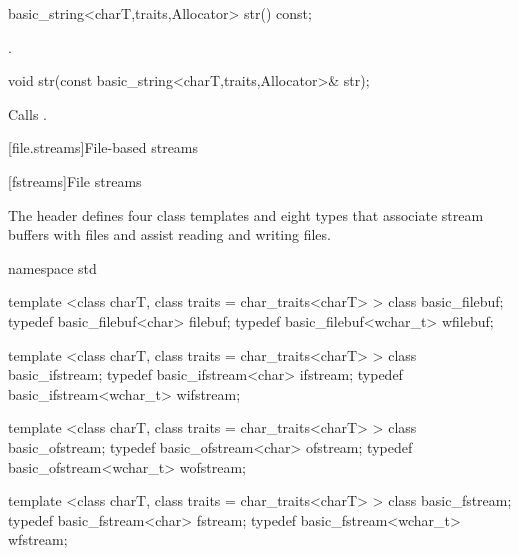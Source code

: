 %
\begin{itemdecl}
basic_string<charT,traits,Allocator> str() const;
\end{itemdecl}

\begin{itemdescr}
\pnum
\returns
{}.
\end{itemdescr}

%
%
\begin{itemdecl}
void str(const basic_string<charT,traits,Allocator>& str);
\end{itemdecl}

\begin{itemdescr}
\pnum
\effects
Calls
.
\end{itemdescr}

[file.streams]{File-based streams}

[fstreams]{File streams}

\pnum
The header
defines four class templates and eight types
that associate stream buffers with files and assist
reading and writing files.

%
%
%
%
%
%
%
%
%
%
%
%
%
\begin{codeblock}
namespace std {
  template <class charT, class traits = char_traits<charT> >
    class basic_filebuf;
  typedef basic_filebuf<char>    filebuf;
  typedef basic_filebuf<wchar_t> wfilebuf;

  template <class charT, class traits = char_traits<charT> >
    class basic_ifstream;
  typedef basic_ifstream<char>    ifstream;
  typedef basic_ifstream<wchar_t> wifstream;

  template <class charT, class traits = char_traits<charT> >
    class basic_ofstream;
  typedef basic_ofstream<char>    ofstream;
  typedef basic_ofstream<wchar_t> wofstream;

  template <class charT, class traits = char_traits<charT> >
    class basic_fstream;
  typedef basic_fstream<char>     fstream;
  typedef basic_fstream<wchar_t> wfstream;
}
\end{codeblock}

